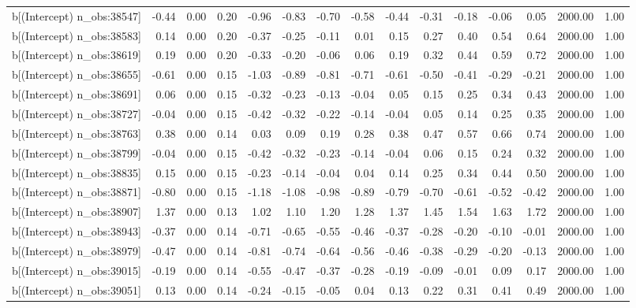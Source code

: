 \begin{table}[ht]
\begin{tabular}{rrrrrrrrrrrrrrr}
  b[(Intercept) n\_obs:38547] & -0.44 & 0.00 & 0.20 & -0.96 & -0.83 & -0.70 & -0.58 & -0.44 & -0.31 & -0.18 & -0.06 & 0.05 & 2000.00 & 1.00 \\ 
  b[(Intercept) n\_obs:38583] & 0.14 & 0.00 & 0.20 & -0.37 & -0.25 & -0.11 & 0.01 & 0.15 & 0.27 & 0.40 & 0.54 & 0.64 & 2000.00 & 1.00 \\ 
  b[(Intercept) n\_obs:38619] & 0.19 & 0.00 & 0.20 & -0.33 & -0.20 & -0.06 & 0.06 & 0.19 & 0.32 & 0.44 & 0.59 & 0.72 & 2000.00 & 1.00 \\ 
  b[(Intercept) n\_obs:38655] & -0.61 & 0.00 & 0.15 & -1.03 & -0.89 & -0.81 & -0.71 & -0.61 & -0.50 & -0.41 & -0.29 & -0.21 & 2000.00 & 1.00 \\ 
  b[(Intercept) n\_obs:38691] & 0.06 & 0.00 & 0.15 & -0.32 & -0.23 & -0.13 & -0.04 & 0.05 & 0.15 & 0.25 & 0.34 & 0.43 & 2000.00 & 1.00 \\ 
  b[(Intercept) n\_obs:38727] & -0.04 & 0.00 & 0.15 & -0.42 & -0.32 & -0.22 & -0.14 & -0.04 & 0.05 & 0.14 & 0.25 & 0.35 & 2000.00 & 1.00 \\ 
  b[(Intercept) n\_obs:38763] & 0.38 & 0.00 & 0.14 & 0.03 & 0.09 & 0.19 & 0.28 & 0.38 & 0.47 & 0.57 & 0.66 & 0.74 & 2000.00 & 1.00 \\ 
  b[(Intercept) n\_obs:38799] & -0.04 & 0.00 & 0.15 & -0.42 & -0.32 & -0.23 & -0.14 & -0.04 & 0.06 & 0.15 & 0.24 & 0.32 & 2000.00 & 1.00 \\ 
  b[(Intercept) n\_obs:38835] & 0.15 & 0.00 & 0.15 & -0.23 & -0.14 & -0.04 & 0.04 & 0.14 & 0.25 & 0.34 & 0.44 & 0.50 & 2000.00 & 1.00 \\ 
  b[(Intercept) n\_obs:38871] & -0.80 & 0.00 & 0.15 & -1.18 & -1.08 & -0.98 & -0.89 & -0.79 & -0.70 & -0.61 & -0.52 & -0.42 & 2000.00 & 1.00 \\ 
  b[(Intercept) n\_obs:38907] & 1.37 & 0.00 & 0.13 & 1.02 & 1.10 & 1.20 & 1.28 & 1.37 & 1.45 & 1.54 & 1.63 & 1.72 & 2000.00 & 1.00 \\ 
  b[(Intercept) n\_obs:38943] & -0.37 & 0.00 & 0.14 & -0.71 & -0.65 & -0.55 & -0.46 & -0.37 & -0.28 & -0.20 & -0.10 & -0.01 & 2000.00 & 1.00 \\ 
  b[(Intercept) n\_obs:38979] & -0.47 & 0.00 & 0.14 & -0.81 & -0.74 & -0.64 & -0.56 & -0.46 & -0.38 & -0.29 & -0.20 & -0.13 & 2000.00 & 1.00 \\ 
  b[(Intercept) n\_obs:39015] & -0.19 & 0.00 & 0.14 & -0.55 & -0.47 & -0.37 & -0.28 & -0.19 & -0.09 & -0.01 & 0.09 & 0.17 & 2000.00 & 1.00 \\ 
  b[(Intercept) n\_obs:39051] & 0.13 & 0.00 & 0.14 & -0.24 & -0.15 & -0.05 & 0.04 & 0.13 & 0.22 & 0.31 & 0.41 & 0.49 & 2000.00 & 1.00 \\ 

\end{tabular}
\end{table}
